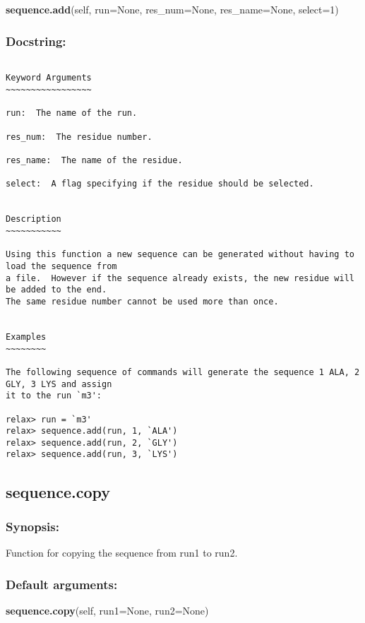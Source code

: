 \textsf{\textbf{sequence.add}(self, run=None, res\_num=None, res\_name=None, select=1)
}


\subsubsection{Docstring:}

{\scriptsize
\begin{verbatim}

Keyword Arguments
~~~~~~~~~~~~~~~~~

run:  The name of the run.

res_num:  The residue number.

res_name:  The name of the residue.

select:  A flag specifying if the residue should be selected.


Description
~~~~~~~~~~~

Using this function a new sequence can be generated without having to load the sequence from
a file.  However if the sequence already exists, the new residue will be added to the end.
The same residue number cannot be used more than once.


Examples
~~~~~~~~

The following sequence of commands will generate the sequence 1 ALA, 2 GLY, 3 LYS and assign
it to the run `m3':

relax> run = `m3'
relax> sequence.add(run, 1, `ALA')
relax> sequence.add(run, 2, `GLY')
relax> sequence.add(run, 3, `LYS')
\end{verbatim}
}



\newpage

\subsection{sequence.copy}


\subsubsection{Synopsis:}

Function for copying the sequence from run1 to run2.

\subsubsection{Default arguments:}

\textsf{\textbf{sequence.copy}(self, run1=None, run2=None)
}


